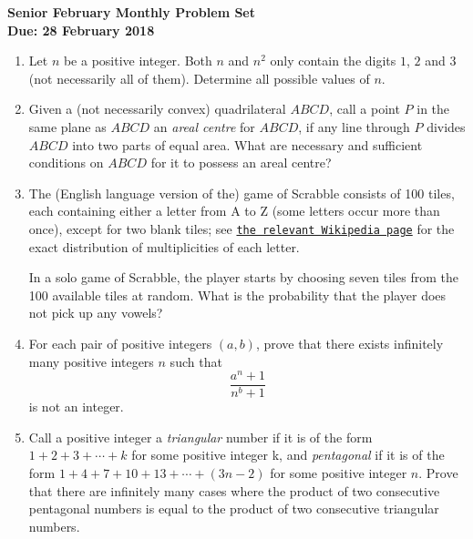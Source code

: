 \documentclass{article}
\begin{document}
\begin{center}
\textbf{\Large Senior February Monthly Problem Set}
\\ \vspace{1em}
\textbf{\large Due: 28 February 2018}
\end{center}

\begin{enumerate}[1.]

\item %
Let $n$ be a positive integer. Both $n$ and $n^2$ only contain the digits $1$, $2$ and $3$ (not necessarily all of them). Determine all possible values of $n$.


\vspace{6pt}
\item %
Given a (not necessarily convex) quadrilateral $ABCD$, call a point $P$ in the same plane as $ABCD$ an \emph{areal centre} for $ABCD$, if any line through $P$ divides $ABCD$ into two parts of equal area. What are necessary and sufficient conditions on $ABCD$ for it to possess an areal centre?


\vspace{6pt}
\item %
The (English language version of the) game of Scrabble\texttrademark{} consists of 100 tiles, each containing either a letter from A to Z (some letters occur more than once), except for two blank tiles; see \href{https://en.wikipedia.org/wiki/Scrabble_letter_distributions#English}{\texttt{the relevant Wikipedia page}} for the exact distribution of multiplicities of each letter.

In a solo game of Scrabble, the player starts by choosing seven tiles from the 100 available tiles at random. What is the probability that the player does not pick up any vowels?


\vspace{6pt}
\item %
For each pair of positive integers $(a, b)$, prove that there exists infinitely many positive integers $n$ such that
$$\frac{a^n + 1}{n^b + 1}$$
is not an integer.


\vspace{6pt}
\item %
Call a positive integer a \emph{triangular} number if it is of the form $1 +2 +3 +\dotsb +k$ for some positive integer k, and \emph{pentagonal} if it is of the form $1 +4 +7 +10 +13 +\dotsb +(3n-2)$ for some positive integer $n$. Prove that there are infinitely many cases where the product of two consecutive pentagonal numbers is equal to the product of two consecutive triangular numbers.



\end{enumerate}
\end{document}
